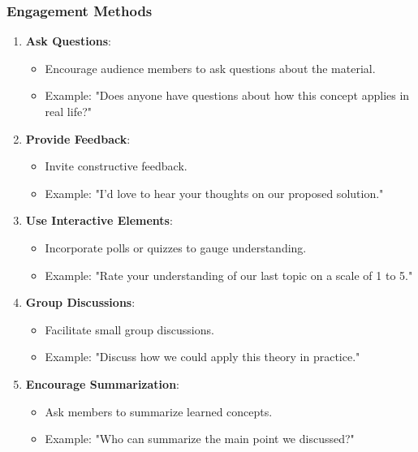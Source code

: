 \documentclass[aspectratio=169]{beamer}
\begin{document}
\begin{frame}[fragile]
    \frametitle{Engagement Methods}
    \begin{enumerate}
        \item \textbf{Ask Questions}:
            \begin{itemize}
                \item Encourage audience members to ask questions about the material.
                \item Example: "Does anyone have questions about how this concept applies in real life?"
            \end{itemize}
        
        \item \textbf{Provide Feedback}:
            \begin{itemize}
                \item Invite constructive feedback.
                \item Example: "I’d love to hear your thoughts on our proposed solution."
            \end{itemize}
        
        \item \textbf{Use Interactive Elements}:
            \begin{itemize}
                \item Incorporate polls or quizzes to gauge understanding.
                \item Example: "Rate your understanding of our last topic on a scale of 1 to 5."
            \end{itemize}

        \item \textbf{Group Discussions}:
            \begin{itemize}
                \item Facilitate small group discussions.
                \item Example: "Discuss how we could apply this theory in practice."
            \end{itemize}

        \item \textbf{Encourage Summarization}:
            \begin{itemize}
                \item Ask members to summarize learned concepts.
                \item Example: "Who can summarize the main point we discussed?"
            \end{itemize}
    \end{enumerate}
\end{frame}
\end{document}
